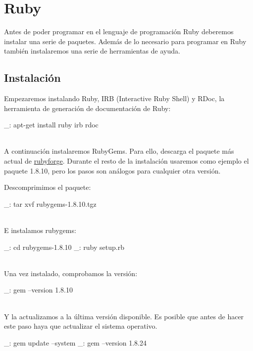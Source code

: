 \chapter{Ruby}
\label{comun:ruby}

Antes de poder programar en el lenguaje de programación Ruby deberemos instalar una serie de paquetes. Además de lo necesario para programar en Ruby también instalaremos una serie de herramientas de ayuda.


\section{Instalación}

Empezaremos instalando Ruby, IRB (Interactive Ruby Shell) y RDoc, la herramienta de generación de documentación de Ruby:

\begin{bashcode}
_: apt-get install ruby irb rdoc
\end{bashcode}
\\

A continuación instalaremos RubyGems. Para ello, descarga el paquete más actual de \href{http://rubyforge.org/frs/?group_id=126}{rubyforge}. Durante el resto de la instalación usaremos como ejemplo el paquete 1.8.10, pero los pasos son análogos para cualquier otra versión.

Descomprimimos el paquete:

\begin{bashcode}
_: tar xvf rubygems-1.8.10.tgz
\end{bashcode}
\\

E instalamos rubygems:

\begin{bashcode}
_: cd rubygems-1.8.10
_: ruby setup.rb
\end{bashcode}
\\

Una vez instalado, comprobamos la versión:

\begin{bashcode}
_: gem --version
1.8.10
\end{bashcode}
\\

Y la actualizamos a la última versión disponible. Es posible que antes de hacer este paso haya que actualizar el sistema operativo.

\begin{bashcode}
_: gem update --system
_: gem --version
1.8.24
\end{bashcode}
\\

